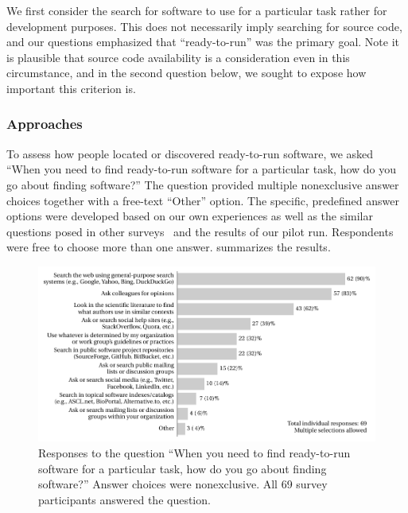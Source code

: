 \documentclass{casicswhitepaper}
\newcommand{\totalrespondents}{69\xspace}
\begin{document}
We first consider the search for software to use for a particular task rather for development purposes. This does not necessarily imply searching for source code, and our questions emphasized that ``ready-to-run'' was the primary goal.  Note it is plausible that source code availability is a consideration even in this circumstance, and in the second question below, we sought to expose how important this criterion is.

 
\subsubsection{Approaches}
\label{approaches-ready-to-use}

To assess how people located or discovered ready-to-run software, we  asked ``When you need to find ready-to-run software for a particular task, how do you go about finding software?''  The question provided multiple nonexclusive answer choices together with a free-text ``Other'' option.  The specific, predefined answer options were developed based on our own experiences as well as the similar questions posed in other surveys~\cite{sim_2011, bajrachary_2009, linstead_2009} and the results of our pilot run.  Respondents were free to choose more than one answer.   summarizes the results.

\begin{figure}[htb]
  \centering
  \includegraphics[trim=0.1in 0.1in 0 0,width=6in]{files/plots/how-find-ready-to-run.pdf}
  \vspace*{-4ex}
  \caption{Responses to the question ``When you need to find ready-to-run software for a particular task, how do you go about finding software?'' Answer choices were nonexclusive. All \totalrespondents survey participants answered the question.}
  \label{how-find-ready-to-run}
\end{figure}
\end{document}
